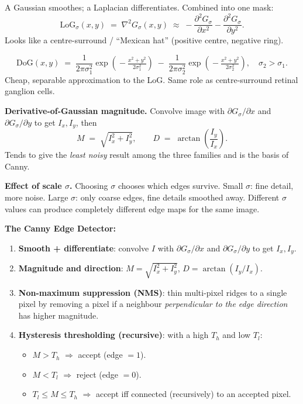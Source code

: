\begin{defbox}
A Gaussian smoothes; a Laplacian differentiates. Combined into one mask:
\[
\text{LoG}_\sigma(x,y) \;=\; \nabla^2 G_\sigma(x,y) \;\approx\; -\frac{\partial^2 G_\sigma}{\partial x^2} - \frac{\partial^2 G_\sigma}{\partial y^2}.
\]
Looks like a centre-surround / ``Mexican hat'' (positive centre, negative ring).
\end{defbox}

\begin{defbox}
\[
\text{DoG}(x,y) \;=\; \frac{1}{2\pi\sigma_1^2}\exp\!\left(\!-\tfrac{x^2+y^2}{2\sigma_1^2}\right) \;-\; \frac{1}{2\pi\sigma_2^2}\exp\!\left(\!-\tfrac{x^2+y^2}{2\sigma_2^2}\right), \quad \sigma_2 > \sigma_1.
\]
Cheap, separable approximation to the LoG. Same role as centre-surround retinal ganglion cells.
\end{defbox}

\textbf{Derivative-of-Gaussian magnitude.} Convolve image with $\partial G_\sigma/\partial x$ and $\partial G_\sigma/\partial y$ to get $I_x, I_y$, then
\[
M \;=\; \sqrt{I_x^2 + I_y^2}, \qquad D \;=\; \arctan\!\left(\frac{I_y}{I_x}\right).
\]
Tends to give the \emph{least noisy} result among the three families and is the basis of Canny.

\separator

\textbf{Effect of scale $\sigma$.} Choosing $\sigma$ chooses which edges survive. Small $\sigma$: fine detail, more noise. Large $\sigma$: only coarse edges, fine details smoothed away. Different $\sigma$ values can produce completely different edge maps for the same image.

\separator

\textbf{The Canny Edge Detector:}

\begin{thmbox}
\begin{enumerate}
  \item \textbf{Smooth + differentiate}: convolve $I$ with $\partial G_\sigma / \partial x$ and $\partial G_\sigma / \partial y$ to get $I_x, I_y$.
  \item \textbf{Magnitude and direction}: $M = \sqrt{I_x^2 + I_y^2}$, $D = \arctan(I_y / I_x)$.
  \item \textbf{Non-maximum suppression (NMS)}: thin multi-pixel ridges to a single pixel by removing a pixel if a neighbour \emph{perpendicular to the edge direction} has higher magnitude.
  \item \textbf{Hysteresis thresholding (recursive)}: with a high $T_h$ and low $T_l$:
  \begin{itemize}
    \item $M > T_h$ $\Rightarrow$ accept (edge $= 1$).
    \item $M < T_l$ $\Rightarrow$ reject (edge $= 0$).
    \item $T_l \leq M \leq T_h$ $\Rightarrow$ accept iff connected (recursively) to an accepted pixel.
  \end{itemize}
\end{enumerate}
\end{thmbox}

